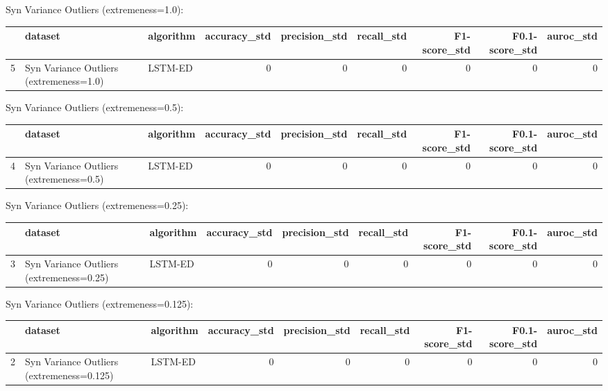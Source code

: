 Syn Variance Outliers (extremeness=1.0):

\begin{tabular}{rllrrrrrr}
\hline
    & dataset                                 & algorithm   &   accuracy\_std &   precision\_std &   recall\_std &   F1-score\_std &   F0.1-score\_std &   auroc\_std \\
\hline
  5 & Syn Variance Outliers (extremeness=1.0) & LSTM-ED     &              0 &               0 &            0 &              0 &                0 &           0 \\
\hline
\end{tabular}

Syn Variance Outliers (extremeness=0.5):

\begin{tabular}{rllrrrrrr}
\hline
    & dataset                                 & algorithm   &   accuracy\_std &   precision\_std &   recall\_std &   F1-score\_std &   F0.1-score\_std &   auroc\_std \\
\hline
  4 & Syn Variance Outliers (extremeness=0.5) & LSTM-ED     &              0 &               0 &            0 &              0 &                0 &           0 \\
\hline
\end{tabular}

Syn Variance Outliers (extremeness=0.25):

\begin{tabular}{rllrrrrrr}
\hline
    & dataset                                  & algorithm   &   accuracy\_std &   precision\_std &   recall\_std &   F1-score\_std &   F0.1-score\_std &   auroc\_std \\
\hline
  3 & Syn Variance Outliers (extremeness=0.25) & LSTM-ED     &              0 &               0 &            0 &              0 &                0 &           0 \\
\hline
\end{tabular}

Syn Variance Outliers (extremeness=0.125):

\begin{tabular}{rllrrrrrr}
\hline
    & dataset                                   & algorithm   &   accuracy\_std &   precision\_std &   recall\_std &   F1-score\_std &   F0.1-score\_std &   auroc\_std \\
\hline
  2 & Syn Variance Outliers (extremeness=0.125) & LSTM-ED     &              0 &               0 &            0 &              0 &                0 &           0 \\
\hline
\end{tabular}

